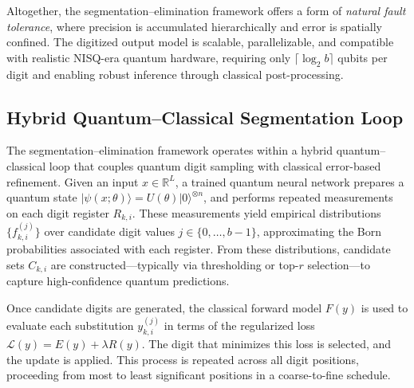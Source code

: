 \documentclass[aps,twocolumn,superscriptaddress,nofootinbib]{revtex4}
\begin{document}
Altogether, the segmentation--elimination framework offers a form of \emph{natural fault tolerance}, where precision is accumulated hierarchically and error is spatially confined. The digitized output model is scalable, parallelizable, and compatible with realistic NISQ-era quantum hardware, requiring only $\lceil \log_2 b \rceil$ qubits per digit and enabling robust inference through classical post-processing.
\subsection{Hybrid Quantum--Classical Segmentation Loop}

The segmentation--elimination framework operates within a hybrid quantum--classical loop that couples quantum digit sampling with classical error-based refinement. Given an input $x \in \mathbb{R}^L$, a trained quantum neural network prepares a quantum state \( |\psi(x; \theta)\rangle = U(\theta)|0\rangle^{\otimes n} \), and performs repeated measurements on each digit register \( R_{k,i} \). These measurements yield empirical distributions \( \{f^{(j)}_{k,i}\} \) over candidate digit values \( j \in \{0, \ldots, b-1\} \), approximating the Born probabilities associated with each register. From these distributions, candidate sets \( C_{k,i} \) are constructed—typically via thresholding or top-$r$ selection—to capture high-confidence quantum predictions.

Once candidate digits are generated, the classical forward model \( F(y) \) is used to evaluate each substitution \( y^{(j)}_{k,i} \) in terms of the regularized loss \( \mathcal{L}(y) = E(y) + \lambda R(y) \). The digit that minimizes this loss is selected, and the update is applied. This process is repeated across all digit positions, proceeding from most to least significant positions in a coarse-to-fine schedule.
\end{document}
